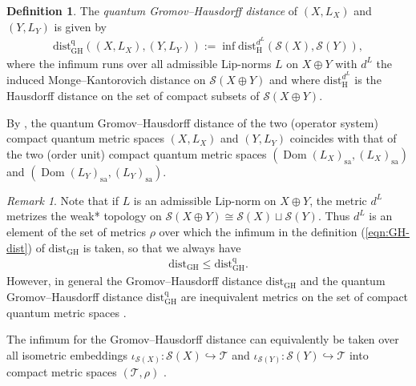 \documentclass{amsart}
\theoremstyle{plain}
\theoremstyle{definition}
\newtheorem{definition}[theorem]{Definition}
\theoremstyle{remark}
\newtheorem{remark}[theorem]{Remark}
\DeclareMathOperator{\Dom}{Dom}
\begin{document}
	\begin{definition}
		The \emph{quantum Gromov--Hausdorff distance} of $(X,L_X)$ and $(Y,L_Y)$ is given by
		\begin{align}
			\mathrm{dist}_{\mathrm{GH}}^\mathrm{q}((X,L_X),(Y,L_Y))
			:= \inf \mathrm{dist}_\mathrm{H}^{d^L}(\mathcal{S}(X),\mathcal{S}(Y)),
		\end{align}
		where the infimum runs over all admissible Lip-norms $L$ on $X \oplus Y$ with $d^L$ the induced Monge--Kantorovich distance on $\mathcal{S}(X \oplus Y)$ and where $\mathrm{dist}_\mathrm{H}^{d^L}$ is the Hausdorff distance on the set of compact subsets of $\mathcal{S}(X \oplus Y)$.
	\end{definition}
	
	By \cite[Lemma 2.12]{KK22}, the quantum Gromov--Hausdorff distance of the two (operator system) compact quantum metric spaces $(X,L_X)$ and $(Y,L_Y)$ coincides with that of the two (order unit) compact quantum metric spaces $(\Dom(L_X)_\mathrm{sa}, (L_X)_\mathrm{sa})$ and $(\Dom(L_Y)_\mathrm{sa}, (L_Y)_\mathrm{sa})$.
	
	\begin{remark}\label{rmk:Comparison-GH-qGH-distance}
		Note that if $L$ is an admissible Lip-norm on $X \oplus Y$, the metric $d^L$ metrizes the weak* topology on $\mathcal{S}(X \oplus Y) \cong \mathcal{S}(X) \sqcup \mathcal{S}(Y)$.
		Thus $d^L$ is an element of the set of metrics $\rho$ over which the infimum in the definition (\ref{eqn:GH-dist}) of $\mathrm{dist}_\mathrm{GH}$ is taken, so that we always have
		\begin{align}
			\mathrm{dist}_\mathrm{GH} \leq \mathrm{dist}_\mathrm{GH}^\mathrm{q}.
		\end{align}
		However, in general the Gromov--Hausdorff distance $\mathrm{dist}_\mathrm{GH}$ and the quantum Gromov--Hausdorff distance $\mathrm{dist}_\mathrm{GH}^\mathrm{q}$ are inequivalent metrics on the set of compact quantum metric spaces \cite{KK23}.
	\end{remark}
	
	The infimum for the Gromov--Hausdorff distance can equivalently be taken over all isometric embeddings $\iota_{\mathcal{S}(X)} : \mathcal{S}(X) \hookrightarrow \mathcal{T}$ and $\iota_{\mathcal{S}(Y)} : \mathcal{S}(Y) \hookrightarrow \mathcal{T}$ into compact metric spaces $(\mathcal{T},\rho)$ \cite[Definition 7.3.10, Remark 7.3.12]{BBI01}.
	
\end{document}
